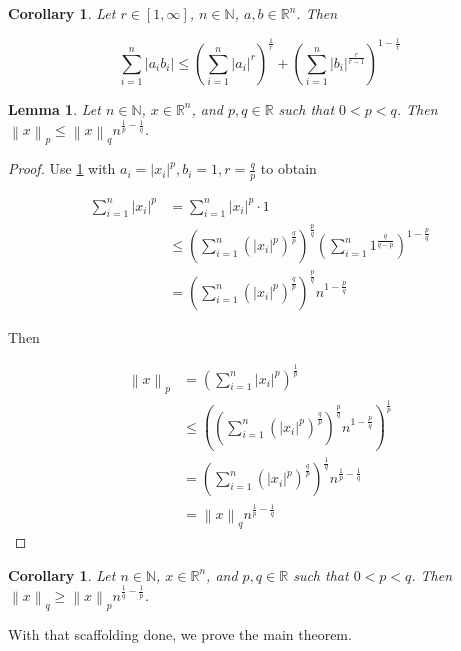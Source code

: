 \documentclass[11pt]{amsart}
\newtheorem{lemma}[theorem]{Lemma}
\newtheorem{corollary}[theorem]{Corollary}
\newcommand{\norm}[1]{\left\lVert #1 \right\rVert}
\begin{document}
\begin{corollary}\label{cor1}
Let $r \in [1, \infty]$, $n \in \mathbb{N}$, $a, b \in \mathbb{R}^n$. Then

$$
\sum_{i=1}^n |a_i b_i| \le \left(\sum_{i=1}^n |a_i|^r\right)^{\frac{1}{r}} + \left(\sum_{i=1}^n |b_i|^{\frac{r}{r-1}}\right)^{1 - \frac{1}{r}}
$$
\end{corollary}

\begin{lemma}\label{lem1}
Let $n \in \mathbb{N}$, $x \in \mathbb{R}^n$, and $p, q \in \mathbb{R}$ such that $0 < p < q$. Then $\norm{x}_p \le \norm{x}_q n^{\frac{1}{p} - \frac{1}{q}}$.
\end{lemma}
\begin{proof}
Use \ref{cor1} with $a_i = |x_i|^p, b_i = 1, r = \frac{q}{p}$ to obtain

\begin{align*}
\sum_{i = 1}^n |x_i|^p &= \sum_{i = 1}^n |x_i|^p \cdot 1\\
                       &\le \left(\sum_{i=1}^n \left(|x_i|^p\right)^{\frac{q}{p}}\right)^{\frac{p}{q}} \left(\sum_{i=1}^n 1^{\frac{q}{q-p}}\right)^{1 - \frac{p}{q}}\\
                       &= \left(\sum_{i=1}^n \left(|x_i|^p\right)^{\frac{q}{p}}\right)^{\frac{p}{q}} n^{1 - \frac{p}{q}}
\end{align*}

Then

\begin{align*}
\norm{x}_p &= \left(\sum_{i=1}^n |x_i|^p \right)^{\frac{1}{p}}\\
           &\le \left(\left(\sum_{i=1}^n \left(|x_i|^p\right)^{\frac{q}{p}}\right)^{\frac{p}{q}} n^{1 - \frac{p}{q}}\right)^{\frac{1}{p}}\\
           &= \left(\sum_{i=1}^n \left(|x_i|^p\right)^{\frac{q}{p}}\right)^{\frac{1}{q}} n^{\frac{1}{p} - \frac{1}{q}}\\
           &= \norm{x}_q n^{\frac{1}{p} - \frac{1}{q}}
\end{align*}
\end{proof}

\begin{corollary}\label{cor2}
Let $n \in \mathbb{N}$, $x \in \mathbb{R}^n$, and $p, q \in \mathbb{R}$ such that $0 < p < q$. Then $\norm{x}_q \ge \norm{x}_p n^{\frac{1}{q} - \frac{1}{p}}$.
\end{corollary}

With that scaffolding done, we prove the main theorem.
\end{document}

